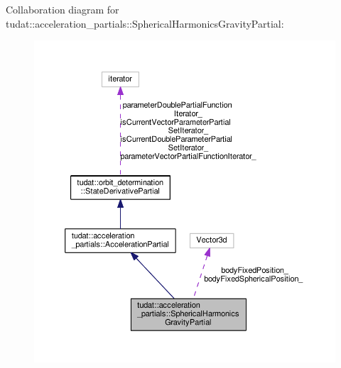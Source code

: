 Collaboration diagram for tudat\+:\+:acceleration\+\_\+partials\+:\+:Spherical\+Harmonics\+Gravity\+Partial\+:
\nopagebreak
\begin{figure}[H]
\begin{center}
\leavevmode
\includegraphics[width=350pt]{classtudat_1_1acceleration__partials_1_1SphericalHarmonicsGravityPartial__coll__graph}
\end{center}
\end{figure}
